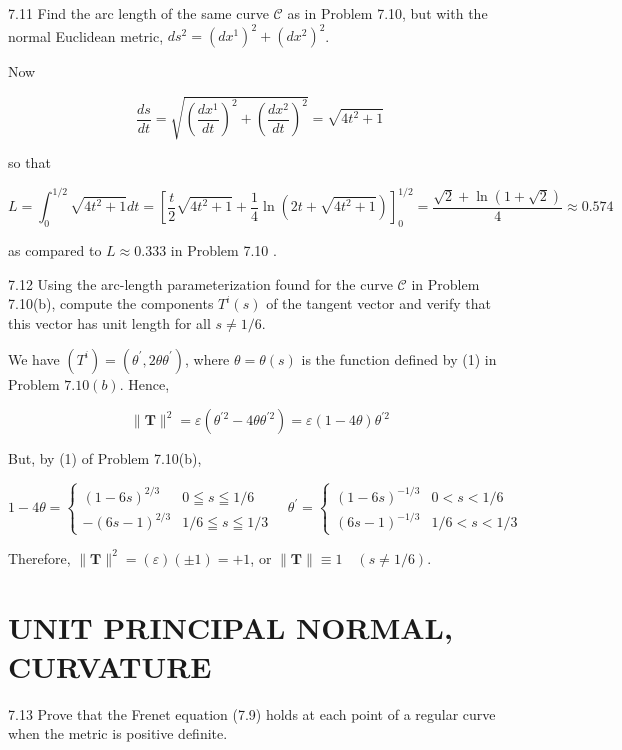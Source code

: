 \documentclass[10pt]{article}
\begin{document}
7.11 Find the arc length of the same curve $\mathscr{C}$ as in Problem 7.10, but with the normal Euclidean metric, $d s^{2}=\left(d x^{1}\right)^{2}+\left(d x^{2}\right)^{2}$.

Now

$$
\frac{d s}{d t}=\sqrt{\left(\frac{d x^{1}}{d t}\right)^{2}+\left(\frac{d x^{2}}{d t}\right)^{2}}=\sqrt{4 t^{2}+1}
$$

so that

$$
L=\int_{0}^{1 / 2} \sqrt{4 t^{2}+1} d t=\left[\frac{t}{2} \sqrt{4 t^{2}+1}+\frac{1}{4} \ln \left(2 t+\sqrt{4 t^{2}+1}\right)\right]_{0}^{1 / 2}=\frac{\sqrt{2}+\ln (1+\sqrt{2})}{4} \approx 0.574
$$

as compared to $L \approx 0.333$ in Problem 7.10 .

7.12 Using the arc-length parameterization found for the curve $\mathscr{C}$ in Problem 7.10(b), compute the components $T^{i}(s)$ of the tangent vector and verify that this vector has unit length for all $s \neq 1 / 6$.

We have $\left(T^{i}\right)=\left(\theta^{\prime}, 2 \theta \theta^{\prime}\right)$, where $\theta=\theta(s)$ is the function defined by (1) in Problem $7.10(b)$. Hence,

$$
\|\mathbf{T}\|^{2}=\varepsilon\left(\theta^{\prime 2}-4 \theta \theta^{\prime 2}\right)=\varepsilon(1-4 \theta) \theta^{\prime 2}
$$

But, by (1) of Problem 7.10(b),

$$
1-4 \theta=\left\{\begin{array}{rrr}
(1-6 s)^{2 / 3} & 0 \leqq s \leqq 1 / 6 \\
-(6 s-1)^{2 / 3} & 1 / 6 \leqq s \leqq 1 / 3
\end{array} \quad \theta^{\prime}=\left\{\begin{array}{rr}
(1-6 s)^{-1 / 3} & 0<s<1 / 6 \\
(6 s-1)^{-1 / 3} & 1 / 6<s<1 / 3
\end{array}\right.\right.
$$

Therefore, $\|\mathbf{T}\|^{2}=(\varepsilon)( \pm 1)=+1$, or $\|\mathbf{T}\| \equiv 1 \quad(s \neq 1 / 6)$.

\section*{UNIT PRINCIPAL NORMAL, CURVATURE}
7.13 Prove that the Frenet equation (7.9) holds at each point of a regular curve when the metric is positive definite.
\end{document}
